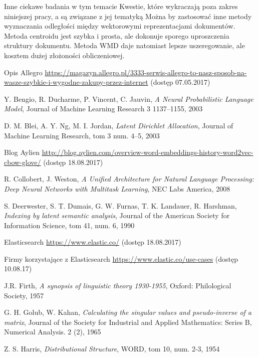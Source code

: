 \documentclass[pl]{minipw} %
\begin{document}
Inne ciekawe badania w tym temacie
Kwestie, które wykraczają poza zakres niniejszej pracy, a są związane z jej tematyką
Można by zastosować inne metody wyznaczania odległości między wektorowymi reprezentacjami dokumentów. Metoda centroidu jest szybka i prosta, ale dokonuje sporego uproszczenia struktury dokumentu. Metoda WMD daje natomiast lepsze uszeregowanie, ale kosztem dużej złożoności obliczeniowej.
\begin{thebibliography}{30}
		Opis Allegro
		\url{https://magazyn.allegro.pl/3333-serwis-allegro-to-nasz-sposob-na-wasze-szybkie-i-wygodne-zakupy-przez-internet}
		(dostęp 07.05.2017)
	
		Y. Bengio, R. Ducharme, P. Vincent, C. Jauvin,
		\emph{A Neural Probabilistic Language Model},
		Journal of Machine Learning Research 3 1137–1155,
		2003
	
		D. M. Blei, A. Y. Ng, M. I. Jordan,
		\emph{Latent Dirichlet Allocation},
		Journal of Machine Learning Research, tom 3 num. 4–5,
		2003
		
		Blog Aylien
		\url{http://blog.aylien.com/overview-word-embeddings-history-word2vec-cbow-glove/}
		(dostęp 18.08.2017)
	
		R. Collobert, J. Weston,
		\emph{A Unified Architecture for Natural Language Processing: Deep Neural Networks with Multitask Learning},
		NEC Labs America,
		2008
	
		S. Deerwester, S. T. Dumais, G. W. Furnas, T. K. Landauer, R. Harshman,
		\emph{Indexing by latent semantic analysis},
		Journal of the American Society for Information Science, tom 41, num. 6,
		1990
	
		Elasticsearch
		\url{https://www.elastic.co/}
		(dostęp 18.08.2017)
	
		Firmy korzystające z Elasticsearch
		\url{https://www.elastic.co/use-cases}
		(dostęp 10.08.17)
	
		J.R. Firth,
		\emph{A synopsis of linguistic theory 1930-1955},
		Oxford: Philological Society,
		1957
	
		G. H. Golub, W. Kahan,
		\emph{Calculating the singular values and pseudo-inverse of a matrix},
		Journal of the Society for Industrial and Applied Mathematics: Series B, Numerical Analysis. 2 (2),
		1965
	
		Z. S. Harris,
		\emph{Distributional Structure},
		WORD, tom 10, num. 2-3,
		1954
	

\end{thebibliography}
\end{document}
